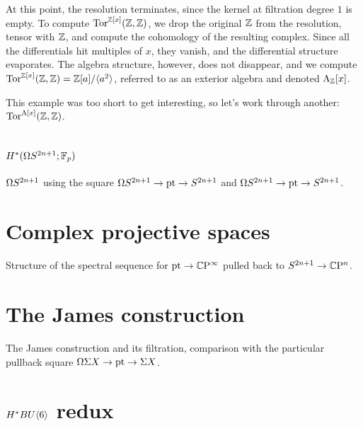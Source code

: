 At this point, the resolution terminates, since the kernel at filtration degree $1$ is empty.  To compute $\operatorname{Tor}^{\mathbb{Z}[x]}(\mathbb{Z}, \mathbb{Z})$, we drop the original $\mathbb{Z}$ from the resolution, tensor with $\mathbb{Z}$, and compute the cohomology of the resulting complex.  Since all the differentials hit multiples of $x$, they vanish, and the differential structure evaporates.  The algebra structure, however, does not disappear, and we compute $\operatorname{Tor}^{\mathbb{Z}[x]}(\mathbb{Z}, \mathbb{Z}) = \mathbb{Z}[a] / \langle a^2\rangle$, referred to as an exterior algebra and denoted $\Lambda_{\mathbb{Z}}[x]$.

This example was too short to get interesting, so let's work through another: $\operatorname{Tor}^{\Lambda[x]}(\mathbb{Z}, \mathbb{Z})$.  

\section{$H^*(\Omega S^{2n+1}; \mathbb{F}_p)$}

$\Omega S^{2n+1}$ using the square $\Omega S^{2n+1} \to \operatorname{pt} \to S^{2n+1}$ and $\Omega S^{2n+1} \to \operatorname{pt} \to S^{2n+1}$.

\section{Complex projective spaces}

Structure of the spectral sequence for $\operatorname{pt} \to \mathbb{C}\mathrm{P}^\infty$ pulled back to $S^{2n+1} \to \mathbb{C}\mathrm{P}^n$.

\section{The James construction}

The James construction and its filtration, comparison with the particular pullback square $\Omega \Sigma X \to \operatorname{pt} \to \Sigma X$.

\section{$H^* BU\langle6\rangle$ redux}

